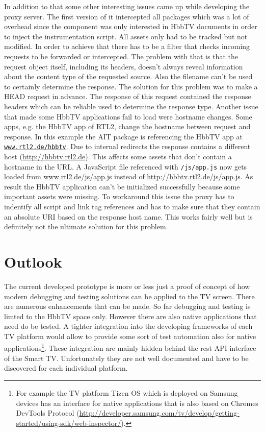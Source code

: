In addition to that some other interesting issues came up while developing the proxy server. The first version of it intercepted all packages which was a lot of overhead since the component was only interested in HbbTV documents in order to inject the instrumentation script. All assets only had to be tracked but not modified. In order to achieve that there has to be a filter that checks incoming requests to be forwarded or intercepted. The problem with that is that the request object itself, including its headers, doesn't always reveal information about the content type of the requested source. Also the filename can't be used to certainly determine the response. The solution for this problem was to make a HEAD request in advance. The response of this request contained the response headers which can be reliable used to determine the response type. Another issue that made some HbbTV applications fail to load were hostname changes. Some apps, e.g. the HbbTV app of RTL2, change the hostname between request and response. In this example the AIT package is referencing the HbbTV app at \texttt{\url{www.rtl2.de/hbbtv}}. Due to internal redirects the response contains a different host (\url{http://hbbtv.rtl2.de}). This affects some assets that don't contain a hostname in the URL. A JavaScript file referenced with \texttt{/js/app.js} now gets loaded from \url{www.rtl2.de/js/app.js} instead of \url{http://hbbtv.rtl2.de/js/app.js}. As result the HbbTV application can't be initialized successfully because some important assets were missing. To workaround this issue the proxy has to indentify all script and link tag references and has to make sure that they contain an absolute URI based on the response host name. This works fairly well but is definitely not the ultimate solution for this problem.

\section{Outlook\label{sec:outlook}}


The current developed prototype is more or less just a proof of concept of how modern debugging and testing solutions can be applied to the TV screen. There are numerous enhancements that can be made. So far debugging and testing is limted to the HbbTV space only. However there are also native applications that need do be tested. A tighter integration into the developing frameworks of each TV platform would allow to provide some sort of test automation also for native applications\footnote{For example the TV platform Tizen OS which is deployed on Samsung devices has an interface for native applications that is also based on Chromes DevTools Protocol (\url{http://developer.samsung.com/tv/develop/getting-started/using-sdk/web-inspector/}).}. These integration are mainly hidden behind the rest API interface of the Smart TV. Unfortunately they are not well documented and have to be discovered for each individual platform.

